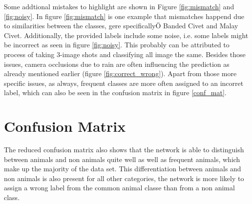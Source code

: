 \documentclass[journal, a4paper]{IEEEtran}
\begin{document}
Some addtional mistakes to highlight are shown in Figure \ref{fig:mismatch} and \ref{fig:noisy}.
In figure \ref{fig:mismatch} is one example that mismatches happend due to similarities between the classes, gere specificallyÖ Banded Civet and Malay Civet.
Additionally, the provided labels include some noise, i.e. some labels might be incorrect as seen in figure \ref{fig:noisy}.
This probably can be attributed to process of taking 3-image shots and classifying all image the same. 
Besides those issues, camera occlusions due to rain are often influencing the prediction as already mentioned earlier (figure \ref{fig:correct_wrong}).
Apart from those more specific issues, as always, frequent classes are more often assigned to an incorret label, which can also be seen in the confusion matrix in figure \ref{conf_mat}.

\section{Confusion Matrix}

The reduced confusion matrix also shows that the network is able to distinguish between animals and non animals quite well as well as frequent animals, which make up the majority of the data set.
This differentiation between animals and non animals is also present for all other categories, the network is more likely to assign a wrong label from the common animal classe than from a non animal class. 

\end{document}

